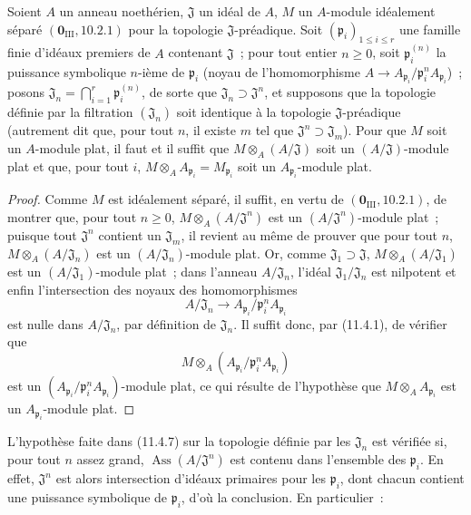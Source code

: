 \begin{proposition}[11.4.7]
\label{IV.11.4.7-fr}
Soient $A$ un anneau noethérien, $\mathfrak J$ un idéal de $A$, $M$ un
$A$-module idéalement séparé $(\mathbf 0_{\mathrm{III}},10.2.1)$ pour la
topologie $\mathfrak J$-préadique. Soit $(\mathfrak p_i)_{1\leq i\leq r}$ une
famille finie d'idéaux premiers de $A$ contenant $\mathfrak J$~; pour tout
entier $n\geq0$, soit $\mathfrak p_i^{(n)}$ la puissance symbolique $n$-ième de
$\mathfrak p_i$ (noyau de l'homomorphisme
$A\to A_{\mathfrak p_i}/\mathfrak p_i^nA_{\mathfrak p_i}$)~; posons
$\mathfrak J_n=\bigcap_{i=1}^{r}\mathfrak p_i^{(n)}$, de sorte que
$\mathfrak J_n\supset\mathfrak J^n$, et supposons que la topologie définie par
la filtration $(\mathfrak J_n)$ soit identique à la topologie
$\mathfrak J$-préadique (autrement dit que, pour tout $n$, il existe $m$ tel
que $\mathfrak J^n\supset\mathfrak J_m$). Pour que $M$ soit un $A$-module
plat, il faut et il suffit que $M\otimes_A(A/\mathfrak J)$ soit un
$(A/\mathfrak J)$-module plat et que, pour tout $i$,
$M\otimes_AA_{\mathfrak p_i}=M_{\mathfrak p_i}$ soit un
$A_{\mathfrak p_i}$-module plat.
\end{proposition}

\begin{proof}
Comme $M$ est idéalement séparé, il suffit, en vertu de
$(\mathbf 0_{\mathrm{III}},10.2.1)$, de montrer que, pour tout $n\geq0$,
$M\otimes_A(A/\mathfrak J^n)$ est un $(A/\mathfrak J^n)$-module plat~;
puisque tout $\mathfrak J^n$ contient un $\mathfrak J_m$, il revient au même
de prouver que pour tout $n$, $M\otimes_A(A/\mathfrak J_n)$ est un
$(A/\mathfrak J_n)$-module plat. Or, comme
$\mathfrak J_1\supset\mathfrak J$, $M\otimes_A(A/\mathfrak J_1)$ est un
$(A/\mathfrak J_1)$-module plat~; dans l'anneau $A/\mathfrak J_n$, l'idéal
$\mathfrak J_1/\mathfrak J_n$ est nilpotent et enfin l'intersection des noyaux
des homomorphismes
\[
A/\mathfrak J_n\longrightarrow
A_{\mathfrak p_i}/\mathfrak p_i^nA_{\mathfrak p_i}
\]
est nulle dans $A/\mathfrak J_n$, par définition de $\mathfrak J_n$. Il suffit
donc, par (11.4.1), de vérifier que
\[
M\otimes_A(A_{\mathfrak p_i}/\mathfrak p_i^nA_{\mathfrak p_i})
\]
est un $(A_{\mathfrak p_i}/\mathfrak p_i^nA_{\mathfrak p_i})$-module plat, ce
qui résulte de l'hypothèse que $M\otimes_AA_{\mathfrak p_i}$ est un
$A_{\mathfrak p_i}$-module plat.
\end{proof}

\begin{remark}[11.4.8]
\label{IV.11.4.8-fr}
L'hypothèse faite dans (11.4.7) sur la topologie définie par les
$\mathfrak J_n$ est vérifiée si, pour tout $n$ assez grand,
$\operatorname{Ass}(A/\mathfrak J^n)$ est contenu dans l'ensemble des
$\mathfrak p_i$. En effet, $\mathfrak J^n$ est alors intersection d'idéaux
primaires pour les $\mathfrak p_i$, dont chacun contient une puissance
symbolique de $\mathfrak p_i$, d'où la conclusion. En particulier~:
\end{remark}

